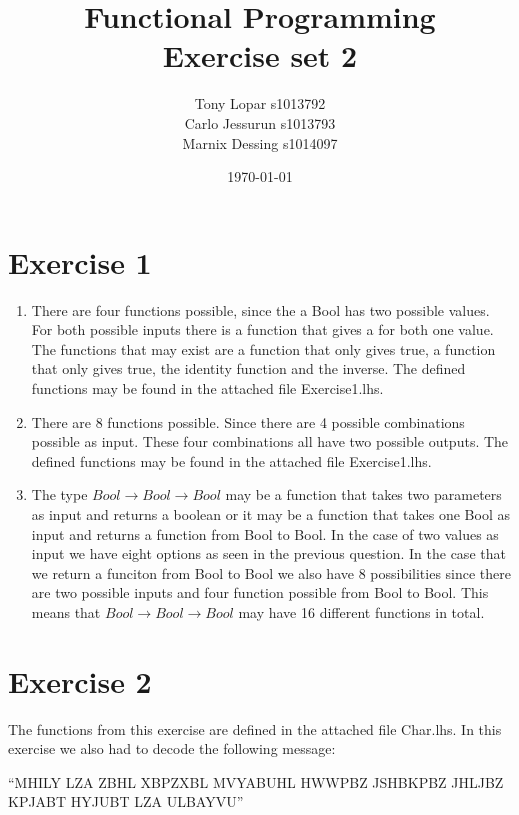 \documentclass{article}
\begin{document}
\title{Functional Programming \\ Exercise set 2}
\date{\today}
\author{Tony Lopar s1013792 \\ Carlo Jessurun s1013793 \\ Marnix Dessing s1014097}
\maketitle

\section*{Exercise 1}
\begin{enumerate}
  \item There are four functions possible, since the a Bool has two possible values. For both possible inputs there is a function that gives a for both one value. The functions that may exist are a function that only gives true, a function that only gives true, the identity function and the inverse. The defined functions may be found in the attached file Exercise1.lhs.
  \item There are 8 functions possible. Since there are 4 possible combinations possible as input. These four combinations all have two possible outputs. The defined functions may be found in the attached file Exercise1.lhs.
  \item The type $Bool \rightarrow Bool \rightarrow Bool$ may be a function that takes two parameters as input and returns a boolean or it may be a function that takes one Bool as input and returns a function from Bool to Bool. In the case of two values as input we have eight options as seen in the previous question. In the case that we return a funciton from Bool to Bool we also have 8 possibilities since there are two possible inputs and four function possible from Bool to Bool. This means that $Bool \rightarrow Bool \rightarrow Bool$ may have 16 different functions in total.
\end{enumerate}

\section*{Exercise 2}
The functions from this exercise are defined in the attached file Char.lhs. In this exercise we also had to decode the following message:

``MHILY LZA ZBHL XBPZXBL MVYABUHL HWWPBZ JSHBKPBZ JHLJBZ KPJABT HYJUBT LZA ULBAYVU''
\end{document}
